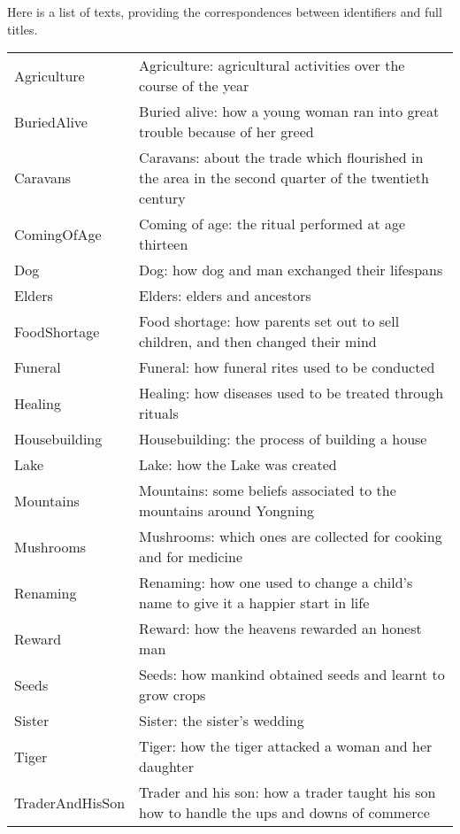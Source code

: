\begin{refsection}
Here is a list of texts, providing the correspondences between
identifiers and full titles.


  
\begin{table}[H]
 	{\renewcommand{\arraystretch}{1.35}
 		\begin{tabularx}{\textwidth}{ @{}l Q }
  Agriculture & Agriculture: agricultural activities over the course of the year\\
  BuriedAlive & Buried alive: how a young woman ran into great trouble because of her greed\\
  Caravans & Caravans: about the trade which flourished in the area in the second quarter of the twentieth century\\
  ComingOfAge & Coming of age: the ritual performed at age thirteen\\
  Dog & Dog: how dog and man exchanged their lifespans\\
  Elders & Elders: elders and ancestors\\
  FoodShortage & Food shortage: how parents set out to sell children, and then changed their mind\\
  Funeral & Funeral: how funeral rites used to be conducted\\
  Healing & Healing: how diseases used to be treated through rituals\\
  Housebuilding & Housebuilding: the process of building a house\\
  Lake & Lake: how the Lake was created\\
  Mountains & Mountains: some beliefs associated to the mountains around Yongning\\
  Mushrooms & Mushrooms: which ones are collected for cooking and for medicine\\
  Renaming & Renaming: how one used to change a child's name
  to give it a happier start in life\\
  Reward & Reward: how the heavens rewarded an honest man\\
  Seeds & Seeds: ﻿how mankind obtained seeds and learnt to grow crops\\
  Sister & Sister: the sister's wedding\\
  Tiger & Tiger: how the tiger attacked a woman and her daughter\\
  TraderAndHisSon & Trader and his son: how a trader taught his son how to handle the ups and downs of commerce\\
\end{tabularx}}
\end{table}



\end{refsection}
